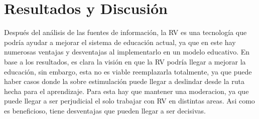 \section{Resultados y Discusión}

Después del análisis de las fuentes de información, la RV es una tecnología que podría ayudar a mejorar el sistema de educación actual, ya que en este hay numerosas ventajas y desventajas al implementarlo en un modelo educativo.
En base a los resultados, es clara la visión en que la RV podría llegar a mejorar la educación, sin embargo, esta no es viable reemplazarla totalmente, ya que puede haber casos donde la sobre estimulación puede llegar a deslindar desde la ruta hecha para el aprendizaje. Para esta hay que mantener una moderacion, ya que puede llegar a ser perjudicial el solo trabajar con RV en distintas areas. Asi como es beneficioso, tiene desventajas que pueden llegar a ser decisivas.

